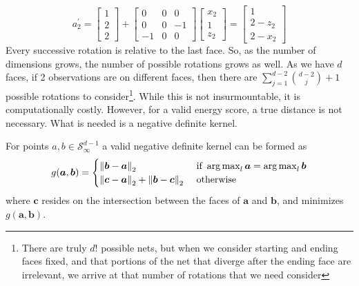   \begin{equation}
    \label{eq:2drotation}
    a_2^{\prime} = \begin{bmatrix}
    1 \\
    2 \\
    2
    \end{bmatrix}
    +
    \begin{bmatrix}
    0 & 0 & 0  \\
    0 & 0 & -1 \\
    -1 & 0 & 0
    \end{bmatrix}
    \begin{bmatrix}
    x_2 \\
    1 \\
    z_2
    \end{bmatrix} = \begin{bmatrix}
    1 \\
    2 - z_2 \\
    2 - x_2
    \end{bmatrix}
  \end{equation}
Every successive rotation is relative to the last face.  So, as the number of dimensions grows, the
  number of possible rotations grows as well.  As we have $d$ faces, if 2 observations are on
  different faces, then there are $\sum_{j = 1}^{d-2}\binom{d-2}{j} + 1$ possible rotations to
  consider\footnote{There are truly $d!$ possible nets, but when we consider starting and ending
  faces fixed, and that portions of the net that diverge after the ending face are irrelevant,
  we arrive at that number of rotations that we need consider}.  While this is not
  insurmountable, it is computationally costly. However, for a valid energy score, a true distance
  is not necessary.  What is needed is a negative definite kernel.

\begin{prop}
For points $a,b \in \mathcal{S}_{\infty}^{d-1}$ a valid negative definite kernel can be formed as
  \begin{equation}
    g(\bm{a},\bm{b}) = \begin{cases}
        \pnorm{\bm{b}-\bm{a}}{2} &\text{ if }\argmax_l\bm{a} = \argmax_l\bm{b}\\
        \pnorm{\bm{c}-\bm{a}}{2} + \pnorm{\bm{b}-\bm{c}}{2} &\text{ otherwise}
    \end{cases}
  \end{equation}
  where $\bm{c}$ resides on the intersection between the faces of $\bm{a}$ and $\bm{b}$, and minimizes $g(\bm{a},\bm{b})$.
\end{prop}

